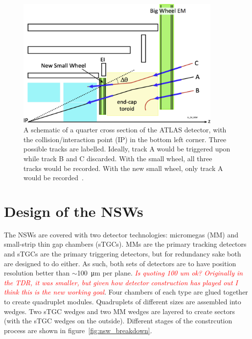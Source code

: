 \begin{figure}
    \centering
    \includegraphics[width = 0.9\textwidth]{figures/perez-codina_NSW_tracks.jpg}
    \caption{A schematic of a quarter cross section of the ATLAS detector, with the collision/interaction point (IP) in the bottom left corner. Three possible tracks are labelled. Ideally, track A would be triggered upon while track B and C discarded. With the small wheel, all three tracks would be recorded. With the new small wheel, only track A would be recorded~\cite{nsw_tdr}.}
    \label{fig:nsw_track_triggering}
\end{figure}

\section{Design of the NSWs}

The NSWs are covered with two detector technologies: micromegas (MM) and small-strip thin gap chambers (sTGCs). MMs are the primary tracking detectors and sTGCs are the primary triggering detectors, but for redundancy sake both are designed to do either. As such, both sets of detectors are to have position resolution better than $\sim$\SI{100}{\micro\meter} per plane. \textcolor{red}{\textit{Is quoting 100 um ok? Originally in the TDR, it was smaller, but given how detector construction has played out I think this is the new working goal}}. Four chambers of each type are glued together to create quadruplet modules. Quadruplets of different sizes are assembled into wedges. Two sTGC wedges and two MM wedges are layered to create sectors (with the sTGC wedges on the outside). Different stages of the constrcution process are shown in figure~\ref{fig:nsw_breakdown}.%

